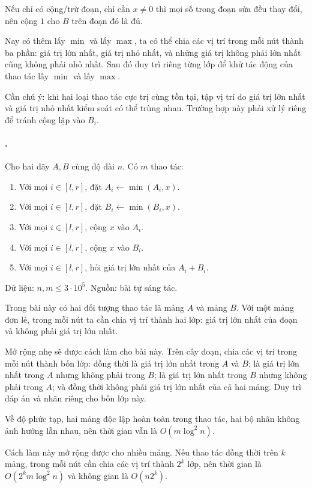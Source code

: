 \documentclass[11pt]{article}
\begin{document}
Nếu chỉ có cộng/trừ đoạn, chỉ cần \(x\ne 0\) thì mọi số trong đoạn sửa đều
thay đổi, nên cộng \(1\) cho \(B\) trên đoạn đó là đủ.

Nay có thêm lấy \(\min\) và lấy \(\max\), ta có thể chia các vị trí trong mỗi
nút thành ba phần: giá trị lớn nhất, giá trị nhỏ nhất, và những giá trị không
phải lớn nhất cũng không phải nhỏ nhất. Sau đó duy trì riêng từng lớp để khử
tác động của thao tác lấy \(\min\) và lấy \(\max\).

Cần chú ý: khi hai loại thao tác cực trị cùng tồn tại, tập vị trí do giá trị
lớn nhất và giá trị nhỏ nhất kiểm soát có thể trùng nhau. Trường hợp này phải
xử lý riêng để tránh cộng lặp vào \(B_i\).

\paragraph{.}
Cho hai dãy \(A,B\) cùng độ dài \(n\). Có \(m\) thao tác:
\begin{enumerate}
  \item Với mọi \(i\in[l,r]\), đặt \(A_i\leftarrow \min(A_i,x)\).
  \item Với mọi \(i\in[l,r]\), đặt \(B_i\leftarrow \min(B_i,x)\).
  \item Với mọi \(i\in[l,r]\), cộng \(x\) vào \(A_i\).
  \item Với mọi \(i\in[l,r]\), cộng \(x\) vào \(B_i\).
  \item Với mọi \(i\in[l,r]\), hỏi giá trị lớn nhất của \(A_i+B_i\).
\end{enumerate}
Dữ liệu: \(n,m\le 3\cdot 10^5\). Nguồn: bài tự sáng tác.

Trong bài này có hai đối tượng thao tác là mảng \(A\) và mảng \(B\). Với một
mảng đơn lẻ, trong mỗi nút ta cần chia vị trí thành hai lớp: giá trị lớn nhất
của đoạn và không phải giá trị lớn nhất.

Mở rộng nhẹ sẽ được cách làm cho bài này. Trên cây đoạn, chia các vị trí
trong mỗi nút thành bốn lớp: đồng thời là giá trị lớn nhất trong \(A\) và
\(B\); là giá trị lớn nhất trong \(A\) nhưng không phải trong \(B\); là giá
trị lớn nhất trong \(B\) nhưng không phải trong \(A\); và đồng thời không
phải giá trị lớn nhất của cả hai mảng. Duy trì đáp án và nhãn riêng cho bốn
lớp này.

Về độ phức tạp, hai mảng độc lập hoàn toàn trong thao tác, hai bộ nhãn không
ảnh hưởng lẫn nhau, nên thời gian vẫn là \(O(m\log^2 n)\).

Cách làm này mở rộng được cho nhiều mảng. Nếu thao tác đồng thời trên \(k\)
mảng, trong mỗi nút cần chia các vị trí thành \(2^k\) lớp, nên thời gian là
\(O(2^k m\log^2 n)\) và không gian là \(O(n2^k)\).
\end{document}
